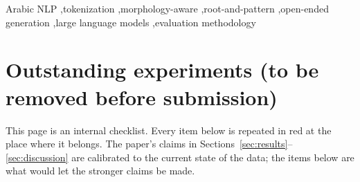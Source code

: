 \documentclass[a4paper,fleqn]{cas-sc}
\begin{document}
\begin{keywords}
Arabic NLP \sep tokenization \sep morphology-aware \sep root-and-pattern \sep open-ended generation \sep large language models \sep evaluation methodology
\end{keywords}

\maketitle

\section*{Outstanding experiments (to be removed before submission)}
This page is an internal checklist. Every item below is repeated in red at the place where it belongs. The paper's claims in Sections~\ref{sec:results}--\ref{sec:discussion} are calibrated to the current state of the data; the items below are what would let the stronger claims be made.
\end{document}
